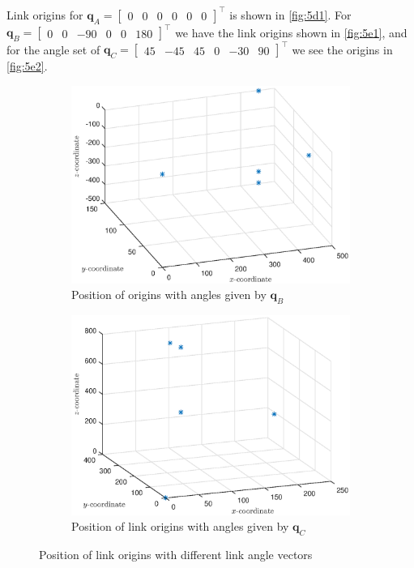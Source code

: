\documentclass[a4paper]{scrartcl}
\begin{document}
\subsection{} %
Link origins for $\bm{q}_A = \begin{bmatrix}
    0 & 0 & 0 & 0 & 0 & 0
\end{bmatrix}^\top$ is shown in \autoref{fig:5d1}. For  $\bm{q}_B = \begin{bmatrix}
    0 & 0 & -90 & 0 & 0 & 180
\end{bmatrix}^\top$ we have the link origins shown in \autoref{fig:5e1}, and for the angle set of $\bm{q}_C = \begin{bmatrix}
    45 & -45 & 45 & 0 & -30 & 90
\end{bmatrix}^\top$ we see the origins in \autoref{fig:5e2}.

\begin{figure}[ht!]
\centering
    \begin{subfigure}{.8\textwidth}
        \centering
        \includegraphics[width=.95\textwidth]{5eB.eps}
        \caption{Position of origins with angles given by $\bm{q}_B$}
        \label{fig:5e1}
    \end{subfigure}
    \begin{subfigure}{.8\textwidth}
        \centering
        \includegraphics[width=.95\textwidth]{5eC.eps}
        \caption{Position of link origins with angles given by $\bm{q}_C$}
        \label{fig:5e2}
    \end{subfigure}
    \caption{Position of link origins with different link angle vectors}
\end{figure}
\end{document}
